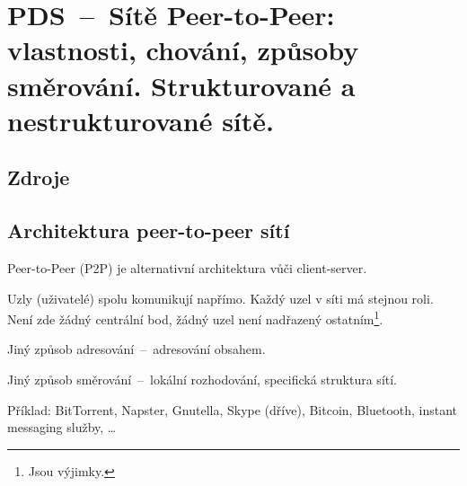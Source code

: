 

\graphicspath{{pds/peer_to_peer_site/figures}}


\chapter{PDS~--~Sítě Peer-to-Peer: vlastnosti, chování, způsoby směrování. Strukturované a nestrukturované sítě.}



\section{Zdroje}

\begin{compactitem}
    \item {}
    \item {}
\end{compactitem}


\section{Architektura peer-to-peer sítí}

\begin{compactitem}
    \item Peer-to-Peer (P2P) je alternativní architektura vůči client-server.
    \item Uzly (uživatelé) spolu komunikují napřímo. Každý uzel v síti má stejnou roli. Není zde žádný centrální bod, žádný uzel není nadřazený ostatním\footnote{Jsou výjimky.}.
    \item Jiný způsob adresování~--~adresování obsahem.
    \item Jiný způsob směrování~--~lokální rozhodování, specifická struktura sítí.
    \item Příklad: BitTorrent, Napster, Gnutella, Skype (dříve), Bitcoin, Bluetooth, instant messaging služby, \dots
\end{compactitem}

